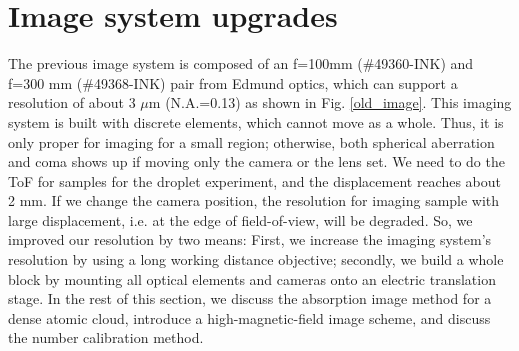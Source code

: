 \section{Image system upgrades}
\label{sec:image}

The previous image system is composed of an f=100mm (\#49360-INK) and f=300 mm (\#49368-INK) pair from Edmund optics, which can support a resolution of about 3 $\mu$m (N.A.=0.13) as shown in Fig. \ref{old_image}. This imaging system is built with discrete elements, which cannot move
as a whole. Thus, it is only proper for imaging for a small region; otherwise, both spherical aberration and coma shows up if moving only the camera or the lens set. We need to do the ToF for samples for the droplet experiment, and the displacement reaches about 2 mm. If we change the camera position, the resolution for imaging sample with large displacement, i.e. at the edge of field-of-view, will be degraded. So, we improved our resolution by two means: First, we increase the imaging system's resolution by using a long working distance objective; secondly, we build a whole block by mounting all optical elements and cameras onto an electric translation stage. In the rest of this section, we discuss the absorption image method for a dense atomic cloud, introduce a high-magnetic-field image scheme, and discuss the number calibration method.

